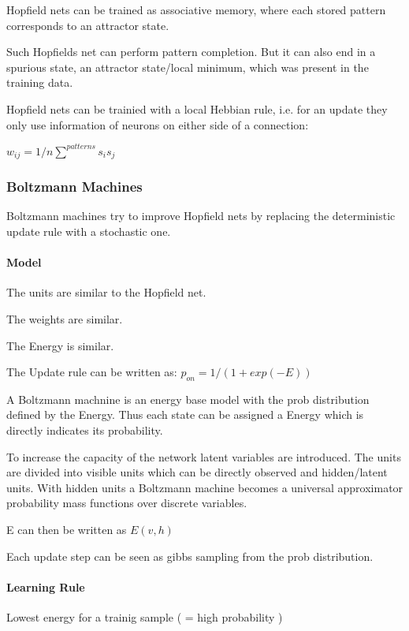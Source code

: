 Hopfield nets can be trained as associative memory, where each stored pattern corresponds to an attractor state.

Such Hopfields net can perform pattern completion. But it can also end in a spurious state, an attractor state/local minimum, which was present in the training data.

Hopfield nets can be trainied with a local Hebbian rule, i.e. for an update they only use information of neurons on either side of a connection:

$w_{ij} = 1/n \sum^{patterns} s_{i} s_{j}$

\subsubsection{Boltzmann Machines}

Boltzmann machines try to improve Hopfield nets by replacing the deterministic update rule with a stochastic one.

\paragraph{Model}

The units are similar to the Hopfield net.

The weights are similar.

The Energy is similar.

The Update rule can be written as: $ p_{on} = 1 / (1+ exp(-E)) $ 

A Boltzmann machnine is an energy base model with the prob distribution defined by the Energy.
Thus each state can be assigned a Energy which is directly indicates its probability.

To increase the capacity of the network latent variables are introduced. 
The units are divided into visible units which can be directly observed and hidden/latent units.
With hidden units a Boltzmann machine becomes a universal approximator probability mass functions over discrete variables.

E can then be written as $E(v,h)$

Each update step can be seen as gibbs sampling from the prob distribution.

\paragraph{Learning Rule}

Lowest energy for a trainig sample ( = high probability )

